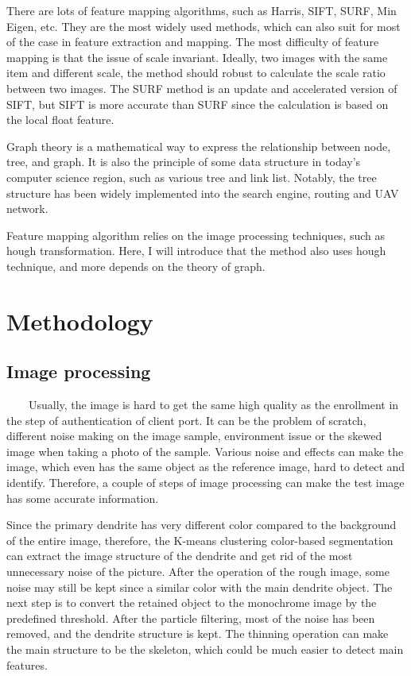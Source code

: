 \documentclass[]{article}   %
\begin{document}
There are lots of feature mapping algorithms, such as Harris, SIFT, SURF, Min Eigen, etc. They are the most widely used methods, which can also suit for most of the case in feature extraction and mapping. The most difficulty of feature mapping is that the issue of scale invariant. Ideally, two images with the same item and different scale, the method should robust to calculate the scale ratio between two images. The SURF method is an update and accelerated version of SIFT, but SIFT is more accurate than SURF since the calculation is based on the local float feature.

Graph theory is a mathematical way to express the relationship between node, tree, and graph. It is also the principle of some data structure in today's computer science region, such as various tree and link list. Notably, the tree structure has been widely implemented into the search engine, routing and UAV network.

Feature mapping algorithm relies on the image processing techniques, such as hough transformation. Here, I will introduce that the method also uses hough technique, and more depends on the theory of graph.    
\section{Methodology}
\subsection{Image processing}
\ \ \ \ Usually, the image is hard to get the same high quality as the enrollment in the step of authentication of client port. It can be the problem of scratch, different noise making on the image sample, environment issue or the skewed image when taking a photo of the sample. Various noise and effects can make the image, which even has the same object as the reference image, hard to detect and identify. Therefore, a couple of steps of image processing can make the test image has some accurate information. 

Since the primary dendrite has very different color compared to the background of the entire image, therefore, the K-means clustering color-based segmentation can extract the image structure of the dendrite and get rid of the most unnecessary noise of the picture. After the operation of the rough image, some noise may still be kept since a similar color with the main dendrite object. The next step is to convert the retained object to the monochrome image by the predefined threshold. After the particle filtering, most of the noise has been removed, and the dendrite structure is kept. The thinning operation can make the main structure to be the skeleton, which could be much easier to detect main features.   
\end{document}
